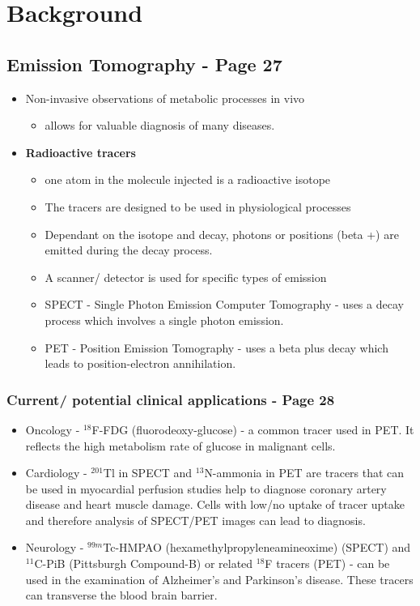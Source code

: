\documentclass{article}
\begin{document}
\section{Background}
\subsection{Emission Tomography  - Page 27}
\begin{itemize}
\item Non-invasive observations of metabolic processes in vivo
\begin{itemize}
\item allows for valuable diagnosis of many diseases.
\end{itemize}

\item \textbf{Radioactive tracers} 
\begin{itemize}
\item one atom in the molecule injected is a radioactive isotope
\item The tracers are designed to be used in physiological processes

\item Dependant on the isotope and decay, photons or positions (beta +) are emitted during the decay process. 
\item A scanner/ detector is used for specific types of emission
\item SPECT - Single Photon Emission Computer Tomography - uses a decay process which involves a single photon emission.
\item PET - Position Emission Tomography - uses a beta plus decay which leads to position-electron annihilation.
\end{itemize}
\end{itemize}

\subsubsection{Current/ potential clinical applications  - Page 28}
\begin{itemize}
\item Oncology - $^{18}$F-FDG (fluorodeoxy-glucose) - a common tracer used in PET. It reflects the high metabolism rate of glucose in malignant cells.
\item Cardiology - $^{201}$Tl in SPECT and $^{13}$N-ammonia in PET are tracers that can be used in myocardial perfusion studies help to diagnose coronary artery disease and heart muscle damage. Cells with low/no uptake of tracer uptake and therefore analysis of SPECT/PET images can lead to diagnosis.
\item Neurology - $^{99m}$Tc-HMPAO (hexamethylpropyleneamineoxime) (SPECT) and $^{11}$C-PiB (Pittsburgh Compound-B) or related $^{18}$F tracers (PET) - can be used in the examination of Alzheimer's and Parkinson's disease. These tracers can transverse the blood brain barrier.
\end{itemize}
\end{document}

